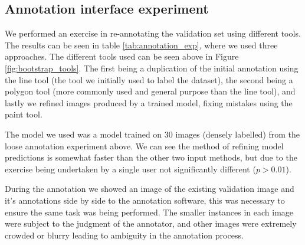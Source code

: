 \begin{table}[!ht]
  \centering
    \caption{Statistics from re-annotation test set}

\noindent{}

\label{tab:loose_exp}
\end{table}






\subsection {Annotation interface experiment}



We performed an exercise in re-annotating the validation set using different tools. The results can be seen in table \ref{tab:annotation_exp}, where we used three approaches. The different tools used can be seen above in Figure \ref{fig:bootstrap_tools}.  The first being a duplication of the initial annotation using the line tool (the tool we initially used to label the dataset), the second being a polygon tool (more commonly used and general purpose than the line tool), and lastly we refined images produced by a trained model, fixing mistakes using the paint tool.

The model we used was a model trained on 30 images (densely labelled) from the loose annotation experiment above. We can see the method of refining model predictions is somewhat faster than the other two input methods, but due to the exercise being undertaken by a single user not significantly different ($ p > 0.01 $).

During the annotation we showed an image of the existing validation image and it's annotations side by side to the annotation software, this was necessary to ensure the same task was being performed. The smaller instances in each image were subject to the judgment of the annotator, and other images were extremely crowded or blurry leading to ambiguity in the annotation process. 



